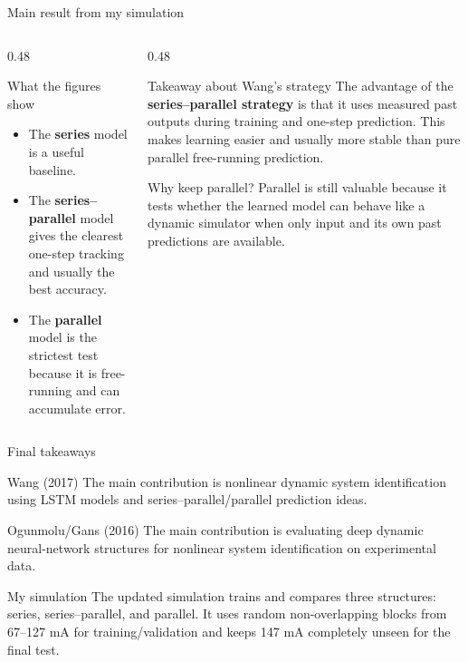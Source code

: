 \documentclass[aspectratio=169,10pt]{beamer}
\begin{document}
\begin{frame}{Main result from my simulation}
\scriptsize
\begin{columns}[T,onlytextwidth]
\begin{column}{0.48\textwidth}
\begin{block}{What the figures show}
\begin{itemize}\itemsep2pt
\item The \textbf{series} model is a useful baseline.
\item The \textbf{series--parallel} model gives the clearest one-step tracking and usually the best accuracy.
\item The \textbf{parallel} model is the strictest test because it is free-running and can accumulate error.
\end{itemize}
\end{block}
\end{column}
\begin{column}{0.48\textwidth}
\begin{block}{Takeaway about Wang's strategy}
The advantage of the \textbf{series--parallel strategy} is that it uses measured past outputs during training and one-step prediction. This makes learning easier and usually more stable than pure parallel free-running prediction.
\end{block}
\begin{block}{Why keep parallel?}
Parallel is still valuable because it tests whether the learned model can behave like a dynamic simulator when only input and its own past predictions are available.
\end{block}
\end{column}
\end{columns}
\end{frame}

\begin{frame}{Final takeaways}
\begin{block}{Wang (2017)}
The main contribution is nonlinear dynamic system identification using LSTM models and series--parallel/parallel prediction ideas.
\end{block}
\begin{block}{Ogunmolu/Gans (2016)}
The main contribution is evaluating deep dynamic neural-network structures for nonlinear system identification on experimental data.
\end{block}
\begin{block}{My simulation}
The updated simulation trains and compares three structures: series, series--parallel, and parallel. It uses random non-overlapping blocks from 67--127 mA for training/validation and keeps 147 mA completely unseen for the final test.
\end{block}
\end{frame}
\end{document}

